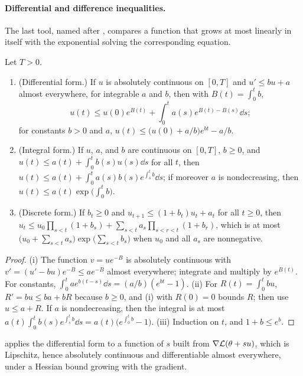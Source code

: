 \begin{refsection}
\paragraph{Differential and difference inequalities.} The last tool, named after \textcite{Gronwall1919}, compares a function that grows at most linearly in itself with the exponential solving the corresponding equation.

\begin{theorem}\label{thm:toolkit:gronwall}
Let $T>0$.
\begin{enumerate}
\item (Differential form.) If $u$ is absolutely continuous on $[0,T]$ and $u'\le bu+a$ almost everywhere, for integrable $a$ and $b$, then with $B(t)=\int_0^tb$,
\[
  u(t)\le u(0)e^{B(t)}+\int_0^ta(s)e^{B(t)-B(s)}\dd s ;
\]
for constants $b>0$ and $a$, $u(t)\le\bigl(u(0)+a/b\bigr)e^{bt}-a/b$.
\item (Integral form.) If $u$, $a$, and $b$ are continuous on $[0,T]$, $b\ge0$, and $u(t)\le a(t)+\int_0^tb(s)u(s)\dd s$ for all $t$, then $u(t)\le a(t)+\int_0^ta(s)b(s)e^{\int_s^tb}\dd s$; if moreover $a$ is nondecreasing, then $u(t)\le a(t)\exp\bigl(\int_0^tb\bigr)$.
\item (Discrete form.) If $b_t\ge0$ and $u_{t+1}\le(1+b_t)u_t+a_t$ for all $t\ge0$, then $u_t\le u_0\prod_{s<t}(1+b_s)+\sum_{s<t}a_s\prod_{s<r<t}(1+b_r)$, which is at most $\bigl(u_0+\sum_{s<t}a_s\bigr)\exp\bigl(\sum_{s<t}b_s\bigr)$ when $u_0$ and all $a_s$ are nonnegative.
\end{enumerate}
\end{theorem}

\begin{proof}
(i) The function $v=ue^{-B}$ is absolutely continuous with $v'=(u'-bu)e^{-B}\le ae^{-B}$ almost everywhere; integrate and multiply by $e^{B(t)}$. For constants, $\int_0^tae^{b(t-s)}\dd s=(a/b)(e^{bt}-1)$. (ii) For $R(t)=\int_0^tbu$, $R'=bu\le ba+bR$ because $b\ge0$, and (i) with $R(0)=0$ bounds $R$; then use $u\le a+R$. If $a$ is nondecreasing, then the integral is at most $a(t)\int_0^tb(s)e^{\int_s^tb}\dd s=a(t)\bigl(e^{\int_0^tb}-1\bigr)$. (iii) Induction on $t$, and $1+b\le e^b$.
\end{proof}

 applies the differential form to a function of $s$ built from $\nabla\mathcal{L}(\theta+su)$, which is Lipschitz, hence absolutely continuous and differentiable almost everywhere, under a Hessian bound growing with the gradient.


\end{refsection}
